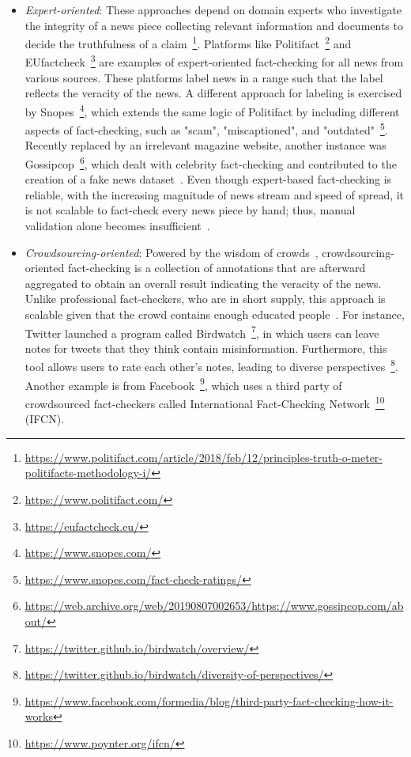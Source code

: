 \begin{description}
    \begin{itemize}
        \item \emph{Expert-oriented}: These approaches depend on domain experts who investigate the integrity of a news piece collecting relevant information and documents to decide the truthfulness of a claim~\footnote{\url{https://www.politifact.com/article/2018/feb/12/principles-truth-o-meter-politifacts-methodology-i/}}. Platforms like Politifact~\footnote{\url{https://www.politifact.com/}} and EUfactcheck~\footnote{\url{https://eufactcheck.eu/}} are examples of expert-oriented fact-checking for all news from various sources. These platforms label news in a range such that the label reflects the veracity of the news. A different approach for labeling is exercised by Snopes~\footnote{\url{https://www.snopes.com/}}, which extends the same logic of Politifact by including different aspects of fact-checking, such as "scam", "miscaptioned", and "outdated"~\footnote{\url{https://www.snopes.com/fact-check-ratings/}}. Recently replaced by an irrelevant magazine website, another instance was Gossipcop~\footnote{\url{https://web.archive.org/web/20190807002653/https://www.gossipcop.com/about/}}, which dealt with celebrity fact-checking and contributed to the creation of a fake news dataset~\parencite{FakeNewsNet_Shu}. Even though expert-based fact-checking is reliable, with the increasing magnitude of news stream and speed of spread, it is not scalable to fact-check every news piece by hand; thus, manual validation alone becomes insufficient~\parencite{ASurveyOnAutomatedFactChecking_Guo}.
        \item \emph{Crowdsourcing-oriented}: Powered by the wisdom of crowds~\parencite{WisdomOfCrowds_Galton}, crowdsourcing-oriented fact-checking is a collection of annotations that are afterward aggregated to obtain an overall result indicating the veracity of the news. Unlike professional fact-checkers, who are in short supply, this approach is scalable given that the crowd contains enough educated people~\parencite{ScalingUpFactChecking_Allen}.  For instance, Twitter launched a program called Birdwatch~\footnote{\url{https://twitter.github.io/birdwatch/overview/}}, in which users can leave notes for tweets that they think contain misinformation. Furthermore, this tool allows users to rate each other’s notes, leading to diverse perspectives~\footnote{\url{https://twitter.github.io/birdwatch/diversity-of-perspectives/}}. Another example is from Facebook~\footnote{\url{https://www.facebook.com/formedia/blog/third-party-fact-checking-how-it-works}}, which uses a third party of crowdsourced fact-checkers called International Fact-Checking Network~\footnote{\url{https://www.poynter.org/ifcn/}} (IFCN).

\end{itemize}
\end{description}
